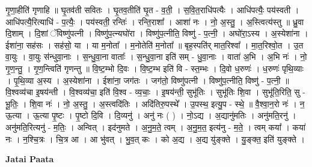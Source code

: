 \documentclass[17pt]{extarticle}
\begin{document}
गृ॒णा॒हीति॑ गृणाहि ॥ घृ॒तव॑ती सवितः । घृ॒तव॒तीति॑ घृ॒त - व॒ती॒ । स॒वि॒त॒राधि॑पत्यैः । आधि॑पत्यैः॒ पय॑स्वती । आधि॑पत्यै॒रित्याधि॑ - प॒त्यैः॒ । पय॑स्वती॒ रन्तिः॑ । रन्ति॒राशा᳚ । आशा॑ नः । नो॒ अ॒स्तु॒ । अ॒स्त्वित्य॑स्तु ॥ ध्रु॒वा दि॒शाम् । दि॒शां ॅविष्णु॑पत्नी । विष्णु॑प॒त्न्यघो॑रा । विष्णु॑प॒त्नीति॒ विष्णु॑ - प॒त्नी॒ । अघो॑रा॒ऽस्य । अ॒स्येशा॑ना । ईशा॑ना॒ सह॑सः । सह॑सो॒ या । या म॒नोता᳚ । म॒नोतेति॑ म॒नोता᳚ ॥ बृह॒स्पति॑र् मात॒रिश्वा᳚ । मा॒त॒रिश्वो॒त । उ॒त वा॒युः । वा॒युः स॑न्धुवा॒नाः । स॒न्धु॒वा॒ना वाताः᳚ । स॒न्धु॒वा॒ना इति॑ सम् - धु॒वा॒नाः । वाता॑ अ॒भि । अ॒भि नः॑ । नो॒ गृ॒ण॒न्तु॒ । गृ॒ण॒न्त्विति॑ गृणन्तु ॥ वि॒ष्ट॒म्भो दि॒वः । वि॒ष्ट॒म्भ इति॑ वि - स्त॒म्भः । दि॒वो ध॒रुणः॑ । ध॒रुणः॑ पृथि॒व्याः । पृ॒थि॒व्या अ॒स्य । अ॒स्येशा॑ना । ईशा॑ना॒ जग॑तः । जग॑तो॒ विष्णु॑पत्नी । विष्णु॑प॒त्नीति॒ विष्णु॑ - प॒त्नी॒ ॥ वि॒श्वव्य॑चा इ॒षय॑न्ती । वि॒श्वव्य॑चा॒ इति॑ वि॒श्व - व्य॒चाः॒ । इ॒षय॑न्ती॒ सुभू॑तिः । सुभू॑तिः शि॒वा । सुभू॑ति॒रिति॒ सु - भू॒तिः॒ । शि॒वा नः॑ । नो॒ अ॒स्तु॒ । अ॒स्त्वदि॑तिः । अदि॑तिरु॒पस्थे᳚ । उ॒पस्थ॒ इत्यु॒प - स्थे॒ ॥ वै॒श्वा॒न॒रो नः॑ । न॒ ऊ॒त्या । ऊ॒त्या पृ॒ष्टः । पृ॒ष्टो दि॒वि । दि॒व्यनु॑ । अनु॑ नः ( ) । नो॒ऽद्य । अ॒द्यानु॑मतिः । अनु॑मति॒रनु॑ । अनु॑मति॒रित्यनु॑ - म॒तिः॒ । अन्वित् । इद॑नुमते । अ॒नु॒म॒ते॒ त्वम् । अ॒नु॒म॒त॒ इत्य॑नु - म॒ते॒ । त्वम् कया᳚ । कया॑ नः । न॒श्चि॒त्रः । चि॒त्र आ । आ भु॑वत् । भु॒व॒त् कः । को अ॒द्य । अ॒द्य यु॑ङ्क्ते । यु॒ङ्क्त॒ इति॑ युङ्क्ते । \newline

\textbf{Jatai Paata} \newline
\end{document}
